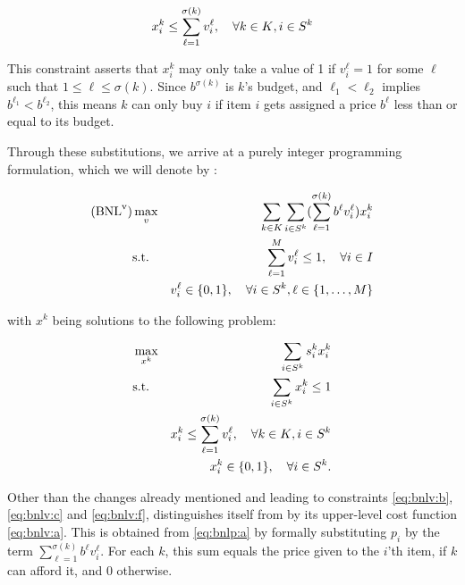 \[
    x_i^k \leq \sum_{\ell=1}^{\sigma(k)} v_i^\ell, \quad \forall {\ensuremath{k \in K}}, {i \in S^k}
\]

This constraint asserts that $x_i^k$ may only take a value of 1 if $v_i^\ell =
1$ for some $\ell$ such that $1 \leq \ell \leq \sigma(k)$. Since $b^{\sigma(k)}$
is $k$'s budget, and $\ell_1 < \ell_2$ implies $b^{\ell_1} < b^{\ell_2}$, this
means $k$ can only buy $i$ if item $i$ gets assigned a price $b^\ell$ less than
or equal to its budget.

Through these substitutions, we arrive at a purely integer programming
formulation, which we will denote by \bnlv:

{
    \newcommand{\sumk} { \sum_\kk }
    \newcommand{\sumi} { \sum_\is }
    \newcommand{\suml} { \sum_{\ell=1}^{\sigma(k)} }
    \newcommand{\summ} { \sum_{\ell=1}^{M} }

    \begin{eqnarray}
        \rm{(BNL}^v\rm{)}
        &\max_v      & \sumk\sumi(\suml b^\ell v_i^\ell) x_i^k     \label{eq:bnlv:a}\\
        &\text{s.t.} & \summ v_i^\ell \leq 1, \quad \forall\ii     \label{eq:bnlv:b}\\
        &            & v_i^\ell \in \binset, \quad \forall\is, \lm \label{eq:bnlv:c}
    \end{eqnarray}
}

\noindent
with $x^k$ being solutions to the following problem:

{
    \newcommand{\sumi} { \sum_\is }
    \newcommand{\suml} { \sum_{\ell=1}^{\sigma(k)} }
    
    \begin{eqnarray}
        &\max_{x^k}  & \sumi s_i^k x_i^k                                \label{eq:bnlv:d}\\
        &\text{s.t.} & \sumi x_i^k \leq 1                               \label{eq:bnlv:e}\\
        &            & x_i^k \leq \suml v_i^\ell, \quad \forall\kk, \is \label{eq:bnlv:f}\\
        &            & x_i^k \in \binset, \quad \forall\is.             \label{eq:bnlv:g}
    \end{eqnarray}
}

\noindent
Other than the changes already mentioned and leading to constraints
\eqref{eq:bnlv:b}, \eqref{eq:bnlv:c} and \eqref{eq:bnlv:f}, \bnlv\newline distinguishes
itself from \bnlp by its upper-level cost function \eqref{eq:bnlv:a}. This is
obtained from \eqref{eq:bnlp:a} by formally substituting $p_i$ by the term
$
    \sum_{\ell=1}^{\sigma(k)} b^\ell v_i^\ell
$. For each $k$, this sum equals the price given to the $i$'th item, if $k$ can
afford it, and 0 otherwise.

